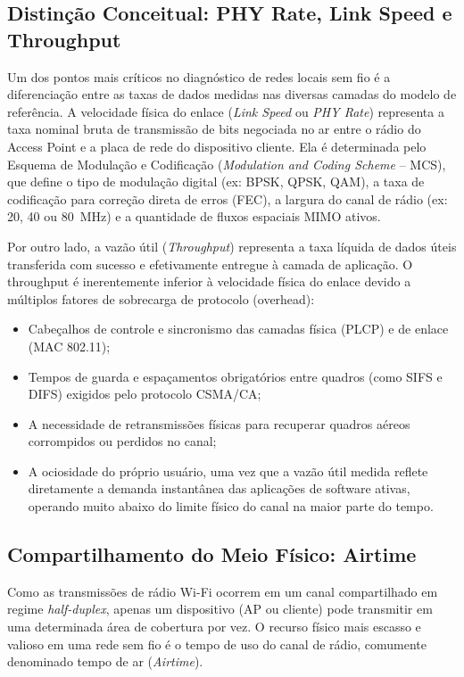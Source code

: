 \subsection{Distinção Conceitual: PHY Rate, Link Speed e Throughput}
\label{subsec:fundamentacao_taxas}

Um dos pontos mais críticos no diagnóstico de redes locais sem fio é a diferenciação entre as taxas de dados medidas nas diversas camadas do modelo de referência. A velocidade física do enlace (\textit{Link Speed} ou \textit{PHY Rate}) representa a taxa nominal bruta de transmissão de bits negociada no ar entre o rádio do Access Point e a placa de rede do dispositivo cliente. Ela é determinada pelo Esquema de Modulação e Codificação (\textit{Modulation and Coding Scheme} -- MCS), que define o tipo de modulação digital (ex: BPSK, QPSK, QAM), a taxa de codificação para correção direta de erros (FEC), a largura do canal de rádio (ex: 20, 40 ou 80~MHz) e a quantidade de fluxos espaciais MIMO ativos.

Por outro lado, a vazão útil (\textit{Throughput}) representa a taxa líquida de dados úteis transferida com sucesso e efetivamente entregue à camada de aplicação. O throughput é inerentemente inferior à velocidade física do enlace devido a múltiplos fatores de sobrecarga de protocolo (overhead):
\begin{itemize}
    \item Cabeçalhos de controle e sincronismo das camadas física (PLCP) e de enlace (MAC 802.11);
    \item Tempos de guarda e espaçamentos obrigatórios entre quadros (como SIFS e DIFS) exigidos pelo protocolo CSMA/CA;
    \item A necessidade de retransmissões físicas para recuperar quadros aéreos corrompidos ou perdidos no canal;
    \item A ociosidade do próprio usuário, uma vez que a vazão útil medida reflete diretamente a demanda instantânea das aplicações de software ativas, operando muito abaixo do limite físico do canal na maior parte do tempo.
\end{itemize}

\subsection{Compartilhamento do Meio Físico: Airtime}
\label{subsec:fundamentacao_airtime}

Como as transmissões de rádio Wi-Fi ocorrem em um canal compartilhado em regime \textit{half-duplex}, apenas um dispositivo (AP ou cliente) pode transmitir em uma determinada área de cobertura por vez. O recurso físico mais escasso e valioso em uma rede sem fio é o tempo de uso do canal de rádio, comumente denominado tempo de ar (\textit{Airtime}). 

